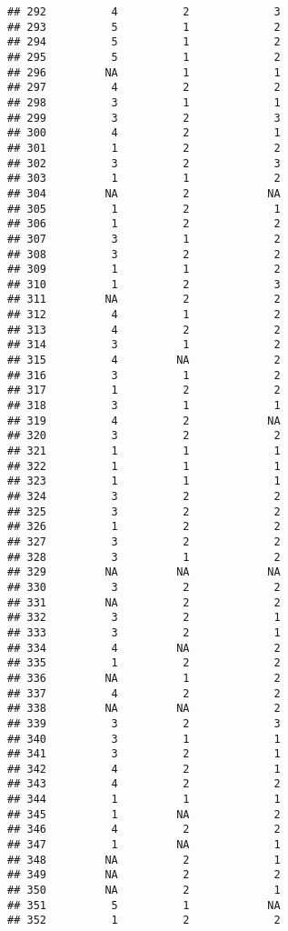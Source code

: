 \documentclass[
]{article}
\begin{document}
\begin{verbatim}
## 292          4          2             3
## 293          5          1             2
## 294          5          1             2
## 295          5          1             2
## 296         NA          1             1
## 297          4          2             2
## 298          3          1             1
## 299          3          2             3
## 300          4          2             1
## 301          1          2             2
## 302          3          2             3
## 303          1          1             2
## 304         NA          2            NA
## 305          1          2             1
## 306          1          2             2
## 307          3          1             2
## 308          3          2             2
## 309          1          1             2
## 310          1          2             3
## 311         NA          2             2
## 312          4          1             2
## 313          4          2             2
## 314          3          1             2
## 315          4         NA             2
## 316          3          1             2
## 317          1          2             2
## 318          3          1             1
## 319          4          2            NA
## 320          3          2             2
## 321          1          1             1
## 322          1          1             1
## 323          1          1             1
## 324          3          2             2
## 325          3          2             2
## 326          1          2             2
## 327          3          2             2
## 328          3          1             2
## 329         NA         NA            NA
## 330          3          2             2
## 331         NA          2             2
## 332          3          2             1
## 333          3          2             1
## 334          4         NA             2
## 335          1          2             2
## 336         NA          1             2
## 337          4          2             2
## 338         NA         NA             2
## 339          3          2             3
## 340          3          1             1
## 341          3          2             1
## 342          4          2             1
## 343          4          2             2
## 344          1          1             1
## 345          1         NA             2
## 346          4          2             2
## 347          1         NA             1
## 348         NA          2             1
## 349         NA          2             2
## 350         NA          2             1
## 351          5          1            NA
## 352          1          2             2

\end{verbatim}
\end{document}
